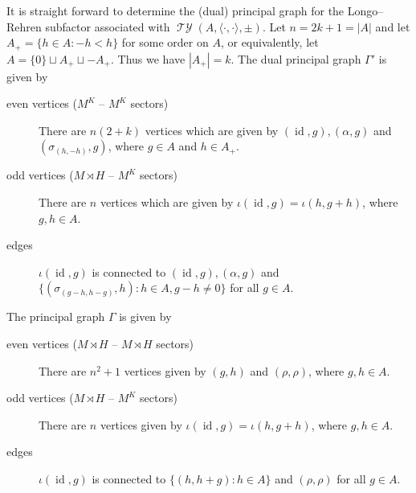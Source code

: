 \documentclass[twoside,11pt,reqno]{amsart}
\theoremstyle{definition}
\theoremstyle{remark}
\DeclareMathOperator{\id}{id}
\DeclareMathOperator*{\TY}{\mathcal{TY}}
\newcommand{\bi}[2]{\langle #1,#2\rangle}
\newcommand{\bislotslot}{\bi\cdot\cdot}
\begin{document}
It is straight forward to determine the (dual) principal graph for the 
Longo--Rehren subfactor associated with $\TY(A,\bislotslot,\pm)$. 
Let $n=2k+1=|A|$ and let
$A_+= \{h\in A : -h<h\}$ for some order on $A$, or equivalently, 
let $A=\{0\}\sqcup A_+\sqcup -A_+$. Thus we have $|A_+|=k$.
The dual principal graph $\Gamma'$ is given by
\begin{description}
  \item[even vertices ($M^K$ -- $M^K$ sectors)] There are $n(2+k)$ vertices which are given by
    $(\id,g),(\alpha,g)$ and $(\sigma_{(h,-h)},g)$, where $g\in A$ and $h\in A_+$.
  \item[odd vertices ($M\rtimes H$ -- $M^K$ sectors)] There are $n$ vertices which are given by
    $\iota(\id,g)=\iota(h,g+h)$, where $g,h\in A$.
  \item[edges]
%
%
%
%
      $\iota(\id,g)$  is connected to    $(\id,g),(\alpha,g)$
    and  $\{(\sigma_{(g-h,h-g)},h): h\in A, g-h\neq 0\}$ for all $g\in A$.
\end{description} 
The principal graph $\Gamma$ is given by
\begin{description}
  \item[even vertices ($M\rtimes H$ -- $M\rtimes H$ sectors)] There are $n^2+1$ 
    vertices given by
    $(g,h)$ and $(\rho,\rho)$, where $g,h\in A$.
  \item[odd vertices ($M\rtimes H$ -- $M^K$ sectors)] There are $n$ vertices given by
    $\iota(\id,g)=\iota(h,g+h)$, where $g,h\in A$.
  \item[edges]
    $\iota(\id,g)$ is connected to $\{(h,h+g):h\in A\}$ and $(\rho,\rho)$ for all $g\in A$.
\end{description} 
\end{document}
